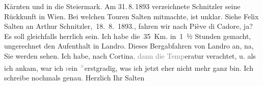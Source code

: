 \begin{ledgroupsized}[t]{13cm}
{{{                     Kärnten und in die Steiermark. Am 31. 8. 1893 verzeichnete Schnitzler seine Rückkunft in Wien. Bei welchen Touren Salten
                  mitmachte, ist unklar. Siehe Felix Salten an Arthur Schnitzler, 18. 8. 1893.}}}\label{K_L03127-1h}, fahren wir nach Piève di Cadore,
               ja? Es soll gleichfalls herrlich sein. Ich habe die 35 Km. in 1 ½ Stunden gemacht,
               ungerechnet den Aufenthalt in Landro. Dieses
               Bergabfahren von Landro an, na, Sie werden sehen.
               Ich habe, nach Cortina\textcolor{gray}{, dann die Temp}eratur verachtet, u. als ich ankam, war ich
                  \textcolor{gray}{r}ein \substVorne{}\textsuperscript{\textcolor{gray}{×}}\substDazwischen{}e\substHinten{}rstgradig, was ich jetzt eher nicht
               mehr ganz bin. Ich schreibe nochmals genau. 
            \pend
           \pstart Herzlich Ihr \spacefill\mbox{Salten}\pend{}
         
         \endnumbering{}\end{ledgroupsized}  \newcommand{\dateiname}{L03127}\newcommand{\titel}{Felix Salten an Arthur Schnitzler, 14. 8. 1893}\newcommand{\editorInnen}{Martin Anton Müller und Laura Untner}
      